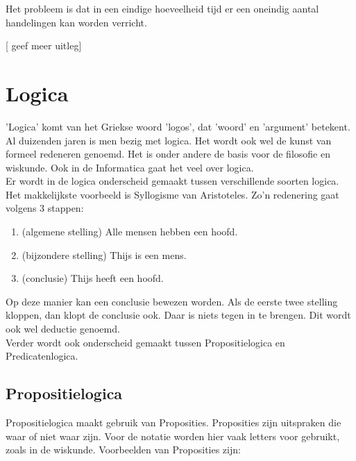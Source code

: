 \documentclass{article}
\begin{document}
\noindent Het probleem is dat in een eindige hoeveelheid tijd er een oneindig aantal handelingen kan worden verricht. \par


		[ geef meer uitleg]
		
	\newpage
	
	
	\section{Logica}
	
	'Logica' komt van het Griekse woord 'logos', dat 'woord' en 'argument' betekent. Al duizenden jaren is men bezig met logica. Het wordt ook wel de kunst van formeel redeneren genoemd. Het is onder andere de basis voor de filosofie en wiskunde. Ook in de Informatica gaat het veel over logica. \\
	Er wordt in de logica onderscheid gemaakt tussen verschillende soorten logica. Het makkelijkste voorbeeld is Syllogisme van Aristoteles. Zo'n redenering gaat volgens 3 stappen:

	\begin{enumerate}
		\item (algemene stelling) Alle mensen hebben een hoofd.
		\item (bijzondere stelling) Thijs is een mens.
		\item (conclusie) Thijs heeft een hoofd.
	\end{enumerate}
	Op deze manier kan een conclusie bewezen worden. Als de eerste twee stelling kloppen, dan klopt de conclusie ook. Daar is niets tegen in te brengen. Dit wordt ook wel deductie genoemd. \\
	Verder wordt ook onderscheid gemaakt tussen Propositielogica en Predicatenlogica.
	
		\subsection{Propositielogica}
		
		Propositielogica maakt gebruik van Proposities. Proposities zijn uitspraken die waar of niet waar zijn. Voor de notatie worden hier vaak letters voor gebruikt, zoals in de wiskunde. Voorbeelden van Proposities zijn:
\end{document}
